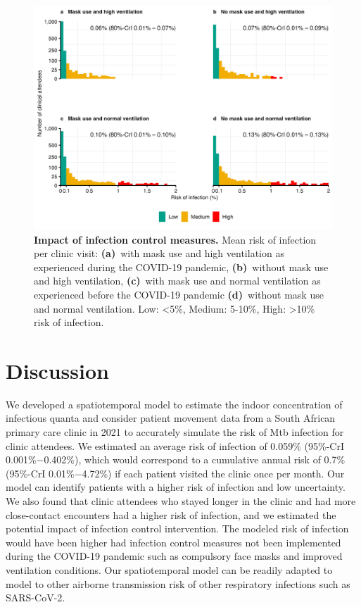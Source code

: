 \documentclass[fleqn,11pt]{wlscirep}
\begin{document}
\begin{figure}
    \centering
    \includegraphics{results/modeling/mean-roi-comparison.png}
    \caption{\textbf{Impact of infection control measures.} Mean risk of infection per clinic visit: \textbf{(a)}~with mask use and high ventilation as experienced during the COVID-19 pandemic, \textbf{(b)}~without mask use and high ventilation, \textbf{(c)}~with mask use and normal ventilation as experienced before the COVID-19 pandemic  \textbf{(d)}~without mask use and normal ventilation. Low: <5\%, Medium: 5-10\%, High: >10\% risk of infection.}
    \label{fig:scenario-results}
\end{figure}


\FloatBarrier

\newpage

\section{Discussion}

We developed a spatiotemporal model to estimate the indoor concentration of infectious quanta and consider patient movement data from a South African primary care clinic in 2021 to accurately simulate the risk of Mtb infection for clinic attendees. We estimated an average risk of infection of 0.059\% (95\%-CrI 0.001\%$-$0.402\%), which would correspond to a cumulative annual risk of 0.7\% (95\%-CrI 0.01\%$-$4.72\%) if each patient visited the clinic once per month. Our model can identify patients with a higher risk of infection and low uncertainty. We also found that clinic attendees who stayed longer in the clinic and had more close-contact encounters  had a higher risk of infection, and we estimated the potential impact of infection control intervention. The modeled risk of infection would have been higher had infection control measures not been implemented during the COVID-19 pandemic such as compulsory face masks and improved ventilation conditions. Our spatiotemporal model can be readily adapted to model to other airborne transmission risk of other respiratory infections such as SARS-CoV-2.
\end{document}
